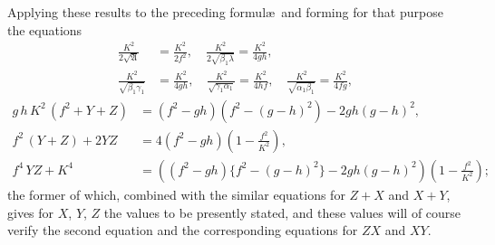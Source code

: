 \documentclass[11pt,a4paper]{book}
\begin{document}
Applying these results to the preceding formul\ae\ and forming for that purpose the equations
\begin{align*}
\tfrac{K^2}{2\sqrt{\mathfrak{A}}} &= \tfrac{K^2}{2f^2}, \quad \tfrac{K^2}{2\sqrt{\beta_1\lambda}} = \tfrac{K^2}{4gh}, \\
\tfrac{K^2}{\sqrt{\beta_1\gamma_1}} &= \tfrac{K^2}{4gh}, \quad \tfrac{K^2}{\sqrt{\gamma_1\alpha_1}} = \tfrac{K^2}{4hf}, \quad \tfrac{K^2}{\sqrt{\alpha_1\beta_1}} = \tfrac{K^2}{4fg},
\end{align*}
\begin{align*}
g\,h\,K^2\,(f^2+Y+Z) &= (f^2-gh)(f^2-(g-h)^2)-2gh(g-h)^2,\\
f^2\,(Y+Z)+2YZ &= 4(f^2-gh)(1-\tfrac{f^2}{K^2}),\\
f^4\,YZ+K^4 &= ((f^2-gh)\{f^2-(g-h)^2\}-2gh(g-h)^2)(1-\tfrac{f^2}{K^2});
\end{align*}
the former of which, combined with the similar equations for $Z+X$ and $X+Y$, gives for $X$, $Y$, $Z$ the values to be presently stated, and these values will of course verify the second equation and the corresponding equations for $ZX$ and $XY$.

\newpage
\setcounter{page}{77}
\end{document}
